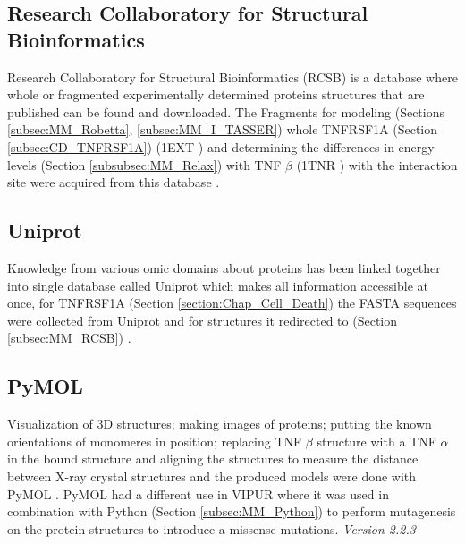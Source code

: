 \subsection{Research Collaboratory for Structural Bioinformatics}
Research Collaboratory for Structural Bioinformatics (RCSB) is a database where whole or fragmented experimentally determined proteins structures that are published can be found and downloaded. The Fragments for modeling (Sections \ref{subsec:MM_Robetta}, \ref{subsec:MM_I_TASSER}) whole TNFRSF1A (Section \ref{subsec:CD_TNFRSF1A}) (1EXT \cite{naismith_structures_1996}) and determining the differences in energy levels (Section \ref{subsubsec:MM_Relax}) with TNF $\beta$ (1TNR \cite{banner_crystal_1993}) with the interaction site were acquired from this database \cite{burley_rcsb_2018}.
\label{subsec:MM_RCSB}

\subsection{Uniprot}
Knowledge from various omic domains about proteins has been linked together into single database called Uniprot which makes all information accessible at once, for TNFRSF1A (Section \ref{section:Chap_Cell_Death}) the FASTA sequences were collected from Uniprot and for structures it redirected to (Section \ref{subsec:MM_RCSB}) \cite{the_uniprot_consortium_uniprot:_2015}.
\label{subsec:MM_Uniprot}

\subsection{PyMOL}
Visualization of 3D structures; making images of proteins; putting the known orientations of monomeres in position; replacing TNF $\beta$ structure with a TNF $\alpha$ in the bound structure and aligning the structures to measure the distance between X-ray crystal structures and the produced models were done with PyMOL \cite{schrodinger_pymol_nodate}. PyMOL had a different use in VIPUR where it was used in combination with Python (Section \ref{subsec:MM_Python}) to perform mutagenesis on the protein structures to introduce a missense mutations.
\label{subsec:MM_PyMOL}
\newline
\textit{Version 2.2.3}

